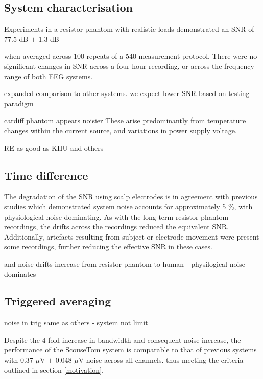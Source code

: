 \subsection{System characterisation}
Experiments in a resistor phantom with realistic loads demonstrated an SNR of 77.5 dB $\pm$ 1.3 dB 




when averaged across 100 repeats of a 540 measurement protocol. There were no significant changes in SNR across a four hour recording, or across the frequency range of both EEG systems. 


expanded comparison to other systems. we expect lower SNR based on testing paradigm

cardiff phantom appears noisier
These arise predominantly from temperature changes within the current source, and variations in power supply voltage.



RE as good as KHU and others


\subsection{Time difference}


 The degradation of the SNR using scalp electrodes is in agreement with previous studies \cite{fabrizi2007analysis} which demonstrated system noise accounts for approximately 5 \%, with physiological noise dominating. As with the long term resistor phantom recordings, the drifts across the recordings reduced the equivalent SNR. Additionally, artefacts resulting from subject or electrode movement were present some recordings, further reducing the effective SNR in these cases.  
 
 and noise drifts increase from resistor phantom to human - physilogical noise dominates
 

\subsection{Triggered averaging}


noise in trig same as others - system not limit



Despite the 4-fold increase in bandwidth and consequent noise increase, the performance of the ScouseTom system is comparable to that of previous systems \cite{Oh2011} with 0.37 $\mu$V $\pm$ 0.048 $\mu$V noise across all channels.
 thus meeting the criteria outlined in section \ref{motivation}.


